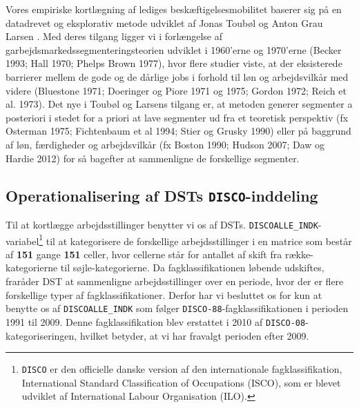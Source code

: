 Vores empiriske kortlægning af lediges beskæftigelsesmobilitet baserer sig på en datadrevet og eksplorativ metode udviklet af Jonas Toubøl og Anton Grau Larsen \parencite{TouboelLarsenJensen2013, TouboelLarsen2015}. Med deres tilgang ligger vi i forlængelse af  garbejdsmarkedssegmenteringsteorien udviklet i 1960'erne og 1970'erne (Becker 1993; Hall 1970; Phelps Brown 1977), hvor flere studier viste, at der eksisterede barrierer mellem de gode og de dårlige jobs i forhold til løn og arbejdsvilkår med videre (Bluestone 1971; Doeringer og Piore 1971 og 1975; Gordon 1972; Reich et al. 1973). Det nye i Toubøl og Larsens tilgang er, at metoden generer segmenter a posteriori i stedet for a priori at lave segmenter ud fra et teoretisk perspektiv (fx Osterman 1975; Fichtenbaum et al 1994; Stier og Grusky 1990) eller på baggrund af løn, færdigheder og arbejdsvilkår (fx Boston 1990; Hudson 2007; Daw og Hardie 2012) for så bagefter at sammenligne de forskellige segmenter.


\subsection{Operationalisering af DSTs \texttt{DISCO}-inddeling}

Til at kortlægge arbejdsstillinger benytter vi os af DSTs. \texttt{DISCOALLE\_INDK}-variabel\footnote{\texttt{DISCO} er den officielle danske version af den internationale fagklassifikation, International Standard Classification of Occupations (ISCO), som er blevet udviklet af International Labour Organisation (ILO).} til at kategorisere de forskellige arbejdsstillinger i en matrice som består af \textbf{151} gange \textbf{151} celler, hvor cellerne står for antallet af skift fra række-kategorierne til søjle-kategorierne. Da fagklassifikationen løbende udskiftes, fraråder DST at sammenligne arbejdsstillinger over en periode, hvor der er flere forskellige typer af fagklassifikationer. Derfor har vi besluttet os for kun at benytte os af \texttt{DISCOALLE\_INDK} som følger \texttt{DISCO-88}-fagklassifikationen i perioden 1991 til 2009. Denne fagklassifikation blev erstattet i 2010 af \texttt{DISCO-08}-kategoriseringen, hvilket betyder, at vi har fravalgt perioden efter 2009.


